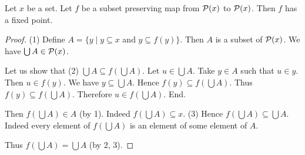 \documentclass[10pt]{article}
\begin{document}
  \begin{forthel}
    \begin{theorem}
      Let $x$ be a set.
      Let $f$ be a subset preserving map from $\mathcal{P}(x)$ to $\mathcal{P}(x)$.
      Then $f$ has a fixed point.
    \end{theorem}
    \begin{proof}
      (1) Define $A = \{ y \mid y \subseteq x$ and $y \subseteq f(y) \}$.
      Then $A$ is a subset of $\mathcal{P}(x)$.
      We have $\bigcup A \in \mathcal{P}(x)$.

      Let us show that (2) $\bigcup A \subseteq f(\bigcup A)$.
        Let $u \in \bigcup A$.
        Take $y \in A$ such that $u \in y$.
        Then $u \in f(y)$.
        We have $y \subseteq \bigcup A$.
        Hence $f(y) \subseteq f(\bigcup A)$.
        Thus $f(y) \subseteq f(\bigcup A)$.
        Therefore $u \in f(\bigcup A)$.
      End.

      Then $f(\bigcup A) \in A$ (by 1).
      Indeed $f(\bigcup A) \subseteq x$.
      (3) Hence $f(\bigcup A) \subseteq \bigcup A$.
      Indeed every element of $f(\bigcup A)$ is an element of some element of
      $A$.

      Thus $f(\bigcup A) = \bigcup A$ (by 2, 3).
    \end{proof}
  \end{forthel}
\end{document}
